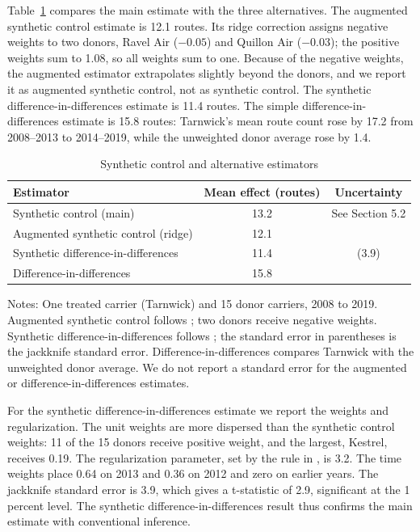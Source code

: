 \documentclass[12pt]{article}
\begin{document}
Table~\ref{tab:alt} compares the main estimate with the three alternatives. The augmented synthetic control estimate is 12.1 routes. Its ridge correction assigns negative weights to two donors, Ravel Air ($-0.05$) and Quillon Air ($-0.03$); the positive weights sum to 1.08, so all weights sum to one. Because of the negative weights, the augmented estimator extrapolates slightly beyond the donors, and we report it as augmented synthetic control, not as synthetic control. The synthetic difference-in-differences estimate is 11.4 routes. The simple difference-in-differences estimate is 15.8 routes: Tarnwick's mean route count rose by 17.2 from 2008--2013 to 2014--2019, while the unweighted donor average rose by 1.4.

\begin{table}[ht]
\centering
\begin{threeparttable}
\caption{Synthetic control and alternative estimators}
\label{tab:alt}
\begin{tabular}{lcc}
\toprule
Estimator & Mean effect (routes) & Uncertainty \\
\midrule
Synthetic control (main) & 13.2 & See Section 5.2 \\
Augmented synthetic control (ridge) & 12.1 & \\
Synthetic difference-in-differences & 11.4 & (3.9) \\
Difference-in-differences & 15.8 & \\
\bottomrule
\end{tabular}
\begin{tablenotes}\footnotesize
\item Notes: One treated carrier (Tarnwick) and 15 donor carriers, 2008 to 2019. Augmented synthetic control follows \citet{benmichael2021}; two donors receive negative weights. Synthetic difference-in-differences follows \citet{arkhangelsky2021}; the standard error in parentheses is the jackknife standard error. Difference-in-differences compares Tarnwick with the unweighted donor average. We do not report a standard error for the augmented or difference-in-differences estimates.
\end{tablenotes}
\end{threeparttable}
\end{table}

For the synthetic difference-in-differences estimate we report the weights and regularization. The unit weights are more dispersed than the synthetic control weights: 11 of the 15 donors receive positive weight, and the largest, Kestrel, receives 0.19. The regularization parameter, set by the rule in \citet{arkhangelsky2021}, is 3.2. The time weights place 0.64 on 2013 and 0.36 on 2012 and zero on earlier years. The jackknife standard error is 3.9, which gives a t-statistic of 2.9, significant at the 1 percent level. The synthetic difference-in-differences result thus confirms the main estimate with conventional inference.
\end{document}
